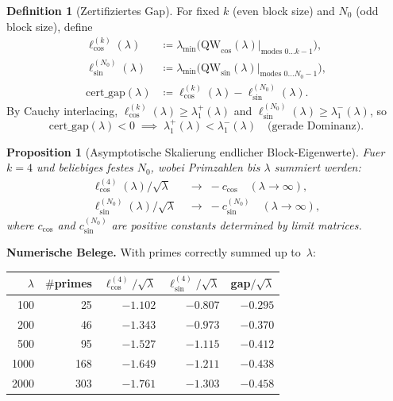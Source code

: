 \documentclass[12pt,a4paper]{article}
\newtheorem{proposition}[theorem]{Proposition}
\theoremstyle{definition}
\newtheorem{definition}[theorem]{Definition}
\theoremstyle{remark}
\begin{document}
\begin{definition}[Zertifiziertes Gap]
For fixed $k$ (even block size) and $N_0$ (odd block size), define
\begin{align*}
  \ell_{\cos}^{(k)}(\lambda) &\coloneqq \lambda_{\min}\!\bigl(\mathrm{QW}_{\cos}(\lambda)\big|_{\text{modes }0\ldots k-1}\bigr), \\
  \ell_{\sin}^{(N_0)}(\lambda) &\coloneqq \lambda_{\min}\!\bigl(\mathrm{QW}_{\sin}(\lambda)\big|_{\text{modes }0\ldots N_0-1}\bigr), \\
  \mathrm{cert\_gap}(\lambda) &\coloneqq \ell_{\cos}^{(k)}(\lambda) - \ell_{\sin}^{(N_0)}(\lambda).
\end{align*}
By Cauchy interlacing, $\ell_{\cos}^{(k)}(\lambda) \geq \lambda_1^+(\lambda)$ and $\ell_{\sin}^{(N_0)}(\lambda) \geq \lambda_1^-(\lambda)$, so
\[
  \mathrm{cert\_gap}(\lambda) < 0 \;\implies\; \lambda_1^+(\lambda) < \lambda_1^-(\lambda) \quad\text{(gerade Dominanz).}
\]
\end{definition}

\begin{proposition}[Asymptotische Skalierung endlicher Block-Eigenwerte]
\label{prop:scaling}
Fuer $k = 4$ und beliebiges festes $N_0$, wobei Primzahlen bis $\lambda$ summiert werden:
\begin{align}
  \ell_{\cos}^{(4)}(\lambda) / \sqrt{\lambda} &\;\to\; -c_{\cos} \quad (\lambda \to \infty), \label{eq:ccos-limit} \\
  \ell_{\sin}^{(N_0)}(\lambda) / \sqrt{\lambda} &\;\to\; -c_{\sin}^{(N_0)} \quad (\lambda \to \infty), \label{eq:csin-limit}
\end{align}
where $c_{\cos}$ and $c_{\sin}^{(N_0)}$ are positive constants determined by limit matrices.
\end{proposition}

\noindent\textbf{Numerische Belege.} With primes correctly summed up to~$\lambda$:

\begin{center}
\renewcommand{\arraystretch}{1.15}
\begin{tabular}{r|r|r|r|r}
$\lambda$ & $\#$primes & $\ell_{\cos}^{(4)}/\sqrt{\lambda}$ & $\ell_{\sin}^{(4)}/\sqrt{\lambda}$ & gap$/\sqrt{\lambda}$ \\\hline
100  & 25  & $-1.102$ & $-0.807$ & $-0.295$ \\
200  & 46  & $-1.343$ & $-0.973$ & $-0.370$ \\
500  & 95  & $-1.527$ & $-1.115$ & $-0.412$ \\
1000 & 168 & $-1.649$ & $-1.211$ & $-0.438$ \\
2000 & 303 & $-1.761$ & $-1.303$ & $-0.458$
\end{tabular}
\end{center}
\end{document}
